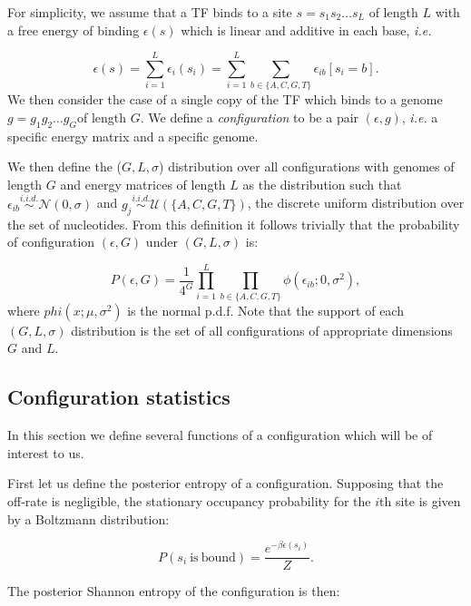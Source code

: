 \documentclass{article}
\begin{document}
For simplicity, we assume that a TF binds to a site $s = s_1s_2\ldots
s_L$ of length $L$ with a free energy of binding $\epsilon(s) $ which
is linear and additive in each base, \textit{i.e.} 

\begin{equation}
  \label{eq:energy_scoring}
\epsilon(s) =
\sum_{i=1}^L\epsilon_i(s_i) =
\sum_{i=1}^L\sum_{b\in\{A,C,G,T\}}\epsilon_{ib}[s_i=b].
\end{equation}
We then consider the case of a single copy of the TF which binds to a
genome $g = g_1g_2\ldots g_G$of length $G$.  We define a
\textit{configuration} to be a pair $(\epsilon,g)$, \textit{i.e.} a
specific energy matrix and a specific genome.

We then define the ($G,L,\sigma$) distribution over all configurations
with genomes of length $G$ and energy matrices of length $L$ as the
distribution such that $\epsilon_{ib}\overset{i.i.d.}{\sim}
\mathcal{N}(0,\sigma)$ and $g_j\overset{i.i.d.}{\sim}
\mathcal{U}(\{A,C,G,T\})$, the discrete uniform distribution over the
set of nucleotides.  From this definition it follows trivially that
the probability of configuration $(\epsilon,G)$ under $(G,L,\sigma)$ is:

  \begin{equation}
    \label{eq:config_prob}
      P(\epsilon,G) = \frac{1}{4^G}\prod_{i=1}^L\prod_{b\in\{A,C,G,T\}}\phi(\epsilon_{ib};0,\sigma^2),
  \end{equation}
  where $phi(x;\mu,\sigma^2)$ is the normal p.d.f.  Note that the
  support of each $(G,L,\sigma)$ distribution is the set of all
  configurations of appropriate dimensions $G$ and $L$.

\subsection{Configuration statistics}
In this section we define several functions of a configuration which
will be of interest to us.  

First let us define the posterior entropy of a configuration.
Supposing that the off-rate is negligible, the stationary occupancy
probability for the $i$th site is given by a Boltzmann distribution:

\begin{equation}
  \label{eq:boltzmann}
  P(s_i\ \mathrm{is\ bound}) = \frac{e^{-\beta\epsilon(s_i)}}{Z}.
\end{equation}

The posterior Shannon entropy of the configuration is then:
\end{document}

